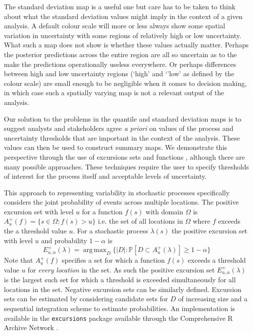 \documentclass[preprint,12pt]{elsarticle}
\DeclareMathOperator*{\argmax}{arg\,max}  %
\begin{document}
The standard deviation map is a useful one but care has to be taken to think about what the standard deviation values might imply in the context of a given analysis.  A default colour scale will more or less always show some spatial variation in uncertainty with some regions of relatively high or low uncertainty.  What such a map does not show is whether these values actually matter.  Perhaps the posterior predictions across the entire region are all so uncertain as to the make the predictions operationally useless everywhere.  Or perhaps differences between high and low uncertainty regions (`high' and `'low' as defined by the colour scale) are small enough to be negligible when it comes to decision making, in which case such a spatially varying map is not a relevant output of the analysis.

Our solution to the problems in the quantile and standard deviation maps is to suggest analysts and stakeholders agree \emph{a priori} on values of the process and uncertainty thresholds that are important in the context of the analysis.  These values can then be used to construct summary maps.  We demonstrate this perspective through the use of excursions sets and functions \citep{bolin_excursion_2015}, although there are many possible approaches.  These techniques require the user to specify thresholds of interest for the process itself and acceptable levels of uncertainty. 

This approach to representing variability in stochastic processes specifically considers the joint probability of events across multiple locations.  The positive excursion set with level $u$ for a function $f(s)$ with domain $\Omega$ is $A_u^{+}(f) = \{ s \in \Omega ; f(s) > u \}$ i.e. the set of all locations in $\Omega$ where $f$ exceeds the a threshold value $u$. For a stochastic process $\lambda(s)$ the positive excursion set with level $u$ and probability $1 - \alpha$ is
\begin{equation*}
E_{u,\alpha}^{+}(\lambda) = \argmax_{D}\{\lvert D \rvert : \mathbb{P}\left[D \subset A_u^{+}(\lambda)\right] \geq 1 - \alpha \}
\end{equation*}
Note that $A_u^{+}(f)$ specifies a set for which a function $f(s)$ exceeds a threshold value $u$ for \textit{every location} in the set.  As such the positive excursion set $E_{u,\alpha}^{+}(\lambda)$ is the largest such set for which a threshold is exceeded simultaneously for all locations in the set.  Negative excursion sets can be similarly defined.  Excursion sets can be estimated by considering candidate sets for $D$ of increasing size and a sequential integration scheme to estimate probabilities.  An implementation is available in the \texttt{excursions} package \citep{bolin_calculating_2018} available through the Comprehensive R Archive Network \citep{r_2017}.
\end{document}
